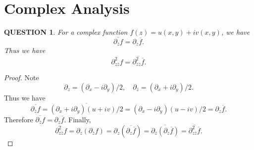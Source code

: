 \documentclass[12pt]{article}
\renewcommand{\(}{\left(}%
\renewcommand{\)}{\right)}%
\renewcommand{\[}{\left[}%
\renewcommand{\]}{\right]}%
\newtheorem{question}{QUESTION}[section]}
\newtheorem{proof}{Proof.}}
\begin{document}
 \section{Complex Analysis}
 \begin{question}
 	For a complex function $f(z)=u(x,y)+iv(x,y)$, we have
 	\begin{equation*}
 		\overline{\partial_{\overline{z}}f}=\partial_{z}\overline{f}.
 	\end{equation*}
 	Thus we have
 	\begin{equation*}
 		\partial^2_{z\overline{z}}f=\overline{\partial^2_{z\overline{z}}\overline{f}}.
 	\end{equation*}
 \end{question}
 \begin{proof}
 	Note 
 	\begin{equation*}
 		\partial_z=(\partial_x-i\partial_y)/2,\quad \partial_{\overline{z}}=(\partial_x+i\partial_y)/2.
 	\end{equation*}
 	Thus we have 
 	\begin{equation*}
 		\overline{\partial_{\overline{z}}f}=\overline{ (\partial_x+i\partial_y)(u+iv)/2}=(\partial_x-i\partial_y)(u-iv)/2=\partial_{z}\overline{f}.
 	\end{equation*}
 	Therefore $\overline{\partial_{\overline{z}}f}=\partial_{z}\overline{f}$. Finally,
 	\begin{equation*}
 		\partial^2_{z\overline{z}}f=\partial_z(\partial_{\overline{z}}f)=\partial_z\(\overline{ \partial_{z}\overline{f}}\)=\overline{ \partial_{\overline{z}}(\partial_z\overline{f})}=\overline{\partial^2_{z\overline{z}}\overline{f}}.
 	\end{equation*}
 \end{proof}
  
\end{document}
